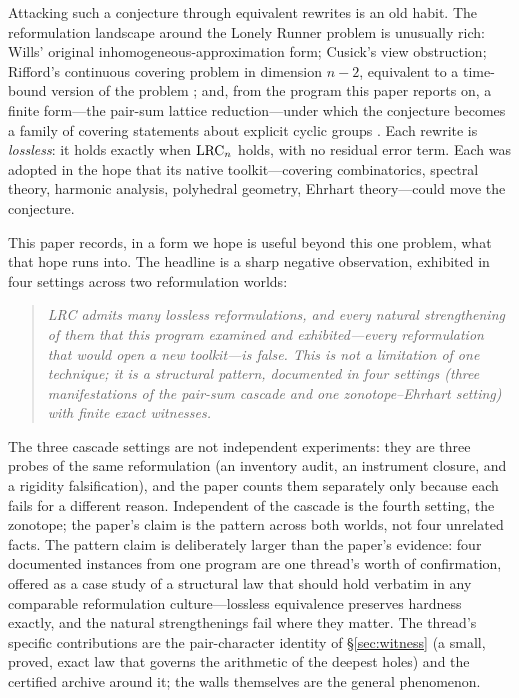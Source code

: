 Attacking such a conjecture through equivalent rewrites is an old habit.
The reformulation landscape around the Lonely Runner problem is unusually
rich: Wills' original inhomogeneous-approximation form; Cusick's view
obstruction; Rifford's continuous covering problem in dimension $n-2$,
equivalent to a time-bound version of the problem \cite{Rifford}; and, from
the program this paper reports on, a finite form---the pair-sum lattice
reduction---under which the conjecture becomes a family of covering
statements about explicit cyclic groups \cite{PS-survey,prog-artifacts}.
Each rewrite is \emph{lossless}: it holds exactly when $\mathrm{LRC}_n$ holds,
with no residual error term. Each was adopted in the hope that its native
toolkit---covering combinatorics, spectral theory, harmonic analysis,
polyhedral geometry, Ehrhart theory---could move the conjecture.

This paper records, in a form we hope is useful beyond this one problem,
what that hope runs into. The headline is a sharp negative observation,
exhibited in four settings across two reformulation worlds:

\begin{quote}
\emph{LRC admits many lossless reformulations, and every natural
strengthening of them that this program examined and exhibited---every
reformulation that would open a new toolkit---is false. This is not a
limitation of one technique; it is a structural pattern, documented in
four settings (three manifestations of the pair-sum cascade and one
zonotope--Ehrhart setting) with finite exact witnesses.}
\end{quote}

The three cascade settings are not independent experiments: they are three
probes of the same reformulation (an inventory audit, an instrument
closure, and a rigidity falsification), and the paper counts them
separately only because each fails for a different reason. Independent of
the cascade is the fourth setting, the zonotope; the paper's claim is the
pattern across both worlds, not four unrelated facts. The pattern claim
is deliberately larger than the paper's evidence: four documented
instances from one program are one thread's worth of confirmation,
offered as a case study of a structural law that should hold verbatim in
any comparable reformulation culture---lossless equivalence preserves
hardness exactly, and the natural strengthenings fail where they matter.
The thread's specific contributions are the pair-character identity of
\S\ref{sec:witness} (a small, proved, exact law that governs the
arithmetic of the deepest holes) and the certified archive around it;
the walls themselves are the general phenomenon.

